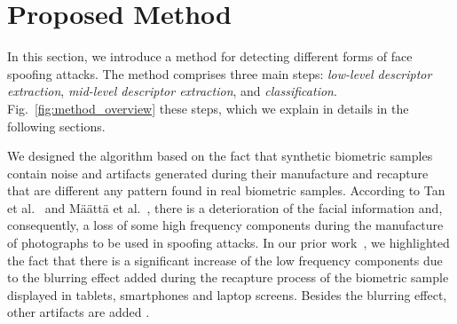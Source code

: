 \section{Proposed Method}\label{sec:method}
In this section, we introduce a method for detecting different forms of face spoofing attacks. The method comprises three main steps: \emph{low-level descriptor extraction}, \emph{mid-level descriptor extraction}, and \emph{classification}. Fig.~\ref{fig:method_overview}  these steps, which we explain in details in the following sections.

We designed the algorithm based on the fact that synthetic biometric samples contain noise and artifacts generated during their manufacture and recapture that are different  any pattern found in real biometric samples. According to Tan et al.~\cite{Tan:ECCV:2010} and M\"{a}\"{a}tt\"{a} et al.~\cite{Maatta:IJCB:2011}, there is a deterioration of the facial information and, consequently, a loss of some high frequency components during the manufacture of photographs to be used in spoofing attacks. In our prior work~\cite{Pinto:SIBGRAPI:2012}, we highlighted the fact that there is a significant increase of the low frequency components due to the blurring effect added during the recapture process of the biometric sample displayed in tablets, smartphones and laptop screens. Besides the blurring effect, other artifacts are added .

